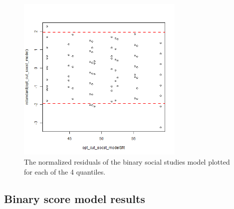 \documentclass[10pt, a4paper]{article}
\begin{document}
	\begin{figure}
		\includegraphics[width=8cm]{lm_socst_binary_outlier_plot.png}
		\centering
		\caption{The normalized residuals of the binary social studies model plotted for each of the 4 quantiles.}
		\label{fig::lm_cut_socst_outlier}
	\end{figure}
 
 	\subsection{Binary score model results}
 	
 	
 	
 	
	
\end{document}
